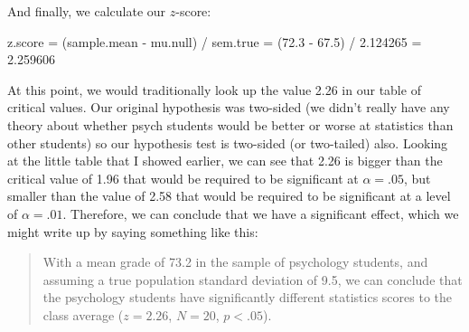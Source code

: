 And finally, we calculate our $z$-score:
\begin{rblock1}
	z.score  = (sample.mean - mu.null) / sem.true 
		 = (72.3 - 67.5) / 2.124265 
		 = 2.259606
\end{rblock1}

At this point, we would traditionally look up the value 2.26 in our table of critical values. Our original hypothesis was two-sided (we didn't really have any theory about whether psych students would be better or worse at statistics than other students) so our hypothesis test is two-sided (or two-tailed) also. Looking at the little table that I showed earlier, we can see that 2.26 is bigger than the critical value of 1.96 that would be required to be significant at $\alpha = .05$, but smaller than the value of 2.58 that would be required to be significant at a level of $\alpha = .01$. Therefore, we can conclude that we have a significant effect, which we might write up by saying something like this:
\begin{quote}
With a mean grade of 73.2 in the sample of psychology students, and assuming a true population standard deviation of 9.5, we can conclude that the psychology students have significantly different statistics scores to the class average ($z = 2.26$, $N=20$, $p<.05$). 
\end{quote}
 

